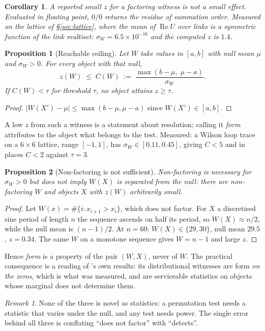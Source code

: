 \documentclass[11pt]{article}
\newtheorem{proposition}{Proposition}
\newtheorem{corollary}{Corollary}
\theoremstyle{remark}
\newtheorem{remark}{Remark}
\begin{document}
\begin{corollary}
A reported small $z$ for a factoring witness is not a small effect. Evaluated in
floating point, $0/0$ returns the residue of summation order. Measured on the lattice of
\S\ref{sec:lattice}, where the mean of $\operatorname{Re}U$ over links is a symmetric
function of the link multiset: $\sigma_W=6.5\times10^{-16}$ and the computed $z$ is
$1.4$.
\end{corollary}

\begin{proposition}[Reachable ceiling]\label{prop:ceiling}
Let $W$ take values in $[a,b]$ with null mean $\mu$ and $\sigma_W>0$. For every object
with that null,
\[
  z(W)\;\le\;C(W)\;:=\;\frac{\max(b-\mu,\;\mu-a)}{\sigma_W}.
\]
If $C(W)<\tau$ for threshold $\tau$, no object attains $z\ge\tau$.
\end{proposition}
\begin{proof}
$|W(X')-\mu|\le\max(b-\mu,\mu-a)$ since $W(X')\in[a,b]$.
\end{proof}

A low $z$ from such a witness is a statement about resolution; calling it \emph{form}
attributes to the object what belongs to the test. Measured: a Wilson loop trace on a
$6\times6$ lattice, range $[-1,1]$, has $\sigma_W\in[0.11,0.45]$, giving $C<5$ and in
places $C<2$ against $\tau=3$.

\begin{proposition}[Non-factoring is not sufficient]\label{prop:necessary}
Non-factoring is necessary for $\sigma_W>0$ but does not imply $W(X)$ is separated from
the null: there are non-factoring $W$ and objects $X$ with $z(W)$ arbitrarily small.
\end{proposition}
\begin{proof}
Let $W(x)=\#\{i:x_{i+1}>x_i\}$, which does not factor. For $X$ a discretised sine period
of length $n$ the sequence ascends on half its period, so $W(X)\approx n/2$, while the
null mean is $(n-1)/2$. At $n=60$: $W(X)\in\{29,30\}$, null mean $29.5$, $z=0.34$. The
same $W$ on a monotone sequence gives $W=n-1$ and large $z$.
\end{proof}

Hence \emph{form} is a property of the pair $(W,X)$, never of $W$. The practical
consequence is a reading of \cite{ff06e}'s own results: its distributional witnesses are
form \emph{on the zeros}, which is what was measured, and are serviceable statistics on
objects whose marginal does not determine them.

\begin{remark}
None of the three is novel as statistics: a permutation test needs a statistic that
varies under the null, and any test needs power. The single error behind all three is
conflating ``does not factor'' with ``detects''.
\end{remark}
\end{document}
